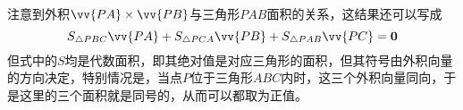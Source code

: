 \begin{example}
  注意到外积$\vv{PA}\times\vv{PB}$与三角形$PAB$面积的关系，这结果还可以写成
  \[ S_{\triangle PBC} \vv{PA} + S_{\triangle PCA} \vv{PB} + S_{\triangle PAB} \vv{PC} = \bm{0} \]
  但式中的$S$均是代数面积，即其绝对值是对应三角形的面积，但其符号由外积向量的方向决定，特别情况是，当点$P$位于三角形$ABC$内时，这三个外积向量同向，于是这里的三个面积就是同号的，从而可以都取为正值。
\end{example}


